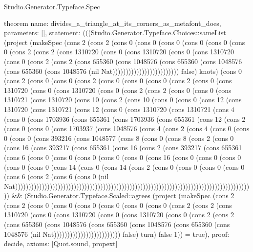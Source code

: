 \begin{lexlean}{Studio.Generator.Typeface.Spec}
\begin{semanticmodule}
theorem{
  name: divides_a_triangle_at_its_corners_as_metafont_does,
  parameters: [],
  statement: (((Studio.Generator.Typeface.Choices::sameList (project (makeSpec (cons 2 (cons 2 (cons 0 (cons 0 (cons 0 (cons 0 (cons 0 (cons 0 (cons 2 (cons 2 (cons 1310720 (cons 0 (cons 1310720 (cons 0 (cons 1310720 (cons 0 (cons 2 (cons 2 (cons 655360 (cons 1048576 (cons 655360 (cons 1048576 (cons 655360 (cons 1048576 (nil Nat))))))))))))))))))))))))) false) knots) (cons 0 (cons 2 (cons 0 (cons 0 (cons 2 (cons 0 (cons 0 (cons 0 (cons 2 (cons 0 (cons 1310720 (cons 0 (cons 1310720 (cons 0 (cons 2 (cons 2 (cons 0 (cons 0 (cons 1310721 (cons 1310720 (cons 10 (cons 2 (cons 10 (cons 0 (cons 0 (cons 12 (cons 1310720 (cons 1310721 (cons 12 (cons 0 (cons 1310720 (cons 1310721 (cons 4 (cons 0 (cons 1703936 (cons 655361 (cons 1703936 (cons 655361 (cons 12 (cons 2 (cons 0 (cons 0 (cons 1703937 (cons 1048576 (cons 4 (cons 2 (cons 4 (cons 0 (cons 0 (cons 0 (cons 393216 (cons 1048577 (cons 8 (cons 0 (cons 8 (cons 2 (cons 0 (cons 16 (cons 393217 (cons 655361 (cons 16 (cons 2 (cons 393217 (cons 655361 (cons 6 (cons 0 (cons 0 (cons 0 (cons 0 (cons 0 (cons 16 (cons 0 (cons 0 (cons 0 (cons 0 (cons 0 (cons 14 (cons 0 (cons 14 (cons 2 (cons 0 (cons 0 (cons 0 (cons 0 (cons 6 (cons 2 (cons 6 (cons 0 (nil Nat)))))))))))))))))))))))))))))))))))))))))))))))))))))))))))))))))))))))))))))))))))))))))) && (Studio.Generator.Typeface.Scaled::agrees (project (makeSpec (cons 2 (cons 2 (cons 0 (cons 0 (cons 0 (cons 0 (cons 0 (cons 0 (cons 2 (cons 2 (cons 1310720 (cons 0 (cons 1310720 (cons 0 (cons 1310720 (cons 0 (cons 2 (cons 2 (cons 655360 (cons 1048576 (cons 655360 (cons 1048576 (cons 655360 (cons 1048576 (nil Nat))))))))))))))))))))))))) false) turn) false 1)) = true),
  proof: decide{},
  axioms: [Quot.sound, propext]
}


\end{semanticmodule}
\end{lexlean}
